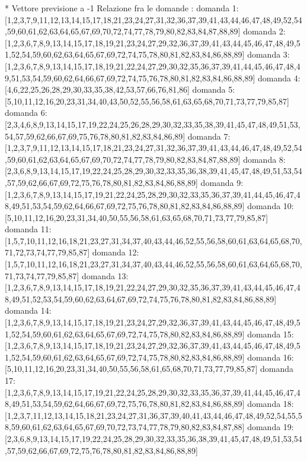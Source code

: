 * Vettore  previsione a -1
Relazione fra le domande :
domanda 1:[1,2,3,7,9,11,12,13,14,15,17,18,21,23,24,27,31,32,36,37,39,41,43,44,46,47,48,49,52,54,59,60,61,62,63,64,65,67,69,70,72,74,77,78,79,80,82,83,84,87,88,89]
domanda 2:[1,2,3,6,7,8,9,13,14,15,17,18,19,21,23,24,27,29,32,36,37,39,41,43,44,45,46,47,48,49,51,52,54,59,60,62,63,64,65,67,69,72,74,75,78,80,81,82,83,84,86,88,89]
domanda 3:[1,2,3,6,7,8,9,13,14,15,17,18,19,21,22,24,27,29,30,32,35,36,37,39,41,44,45,46,47,48,49,51,53,54,59,60,62,64,66,67,69,72,74,75,76,78,80,81,82,83,84,86,88,89]
domanda 4:[4,6,22,25,26,28,29,30,33,35,38,42,53,57,66,76,81,86]
domanda 5:[5,10,11,12,16,20,23,31,34,40,43,50,52,55,56,58,61,63,65,68,70,71,73,77,79,85,87]
domanda 6:[2,3,4,6,8,9,13,14,15,17,19,22,24,25,26,28,29,30,32,33,35,38,39,41,45,47,48,49,51,53,54,57,59,62,66,67,69,75,76,78,80,81,82,83,84,86,89]
domanda 7:[1,2,3,7,9,11,12,13,14,15,17,18,21,23,24,27,31,32,36,37,39,41,43,44,46,47,48,49,52,54,59,60,61,62,63,64,65,67,69,70,72,74,77,78,79,80,82,83,84,87,88,89]
domanda 8:[2,3,6,8,9,13,14,15,17,19,22,24,25,28,29,30,32,33,35,36,38,39,41,45,47,48,49,51,53,54,57,59,62,66,67,69,72,75,76,78,80,81,82,83,84,86,88,89]
domanda 9:[1,2,3,6,7,8,9,13,14,15,17,19,21,22,24,25,28,29,30,32,33,35,36,37,39,41,44,45,46,47,48,49,51,53,54,59,62,64,66,67,69,72,75,76,78,80,81,82,83,84,86,88,89]
domanda 10:[5,10,11,12,16,20,23,31,34,40,50,55,56,58,61,63,65,68,70,71,73,77,79,85,87]
domanda 11:[1,5,7,10,11,12,16,18,21,23,27,31,34,37,40,43,44,46,52,55,56,58,60,61,63,64,65,68,70,71,72,73,74,77,79,85,87]
domanda 12:[1,5,7,10,11,12,16,18,21,23,27,31,34,37,40,43,44,46,52,55,56,58,60,61,63,64,65,68,70,71,73,74,77,79,85,87]
domanda 13:[1,2,3,6,7,8,9,13,14,15,17,18,19,21,22,24,27,29,30,32,35,36,37,39,41,43,44,45,46,47,48,49,51,52,53,54,59,60,62,63,64,67,69,72,74,75,76,78,80,81,82,83,84,86,88,89]
domanda 14:[1,2,3,6,7,8,9,13,14,15,17,18,19,21,23,24,27,29,32,36,37,39,41,43,44,45,46,47,48,49,51,52,54,59,60,61,62,63,64,65,67,69,72,74,75,78,80,82,83,84,86,88,89]
domanda 15:[1,2,3,6,7,8,9,13,14,15,17,18,19,21,23,24,27,29,32,36,37,39,41,43,44,45,46,47,48,49,51,52,54,59,60,61,62,63,64,65,67,69,72,74,75,78,80,82,83,84,86,88,89]
domanda 16:[5,10,11,12,16,20,23,31,34,40,50,55,56,58,61,65,68,70,71,73,77,79,85,87]
domanda 17:[1,2,3,6,7,8,9,13,14,15,17,19,21,22,24,25,28,29,30,32,33,35,36,37,39,41,44,45,46,47,48,49,51,53,54,59,62,64,66,67,69,72,75,76,78,80,81,82,83,84,86,88,89]
domanda 18:[1,2,3,7,11,12,13,14,15,18,21,23,24,27,31,36,37,39,40,41,43,44,46,47,48,49,52,54,55,58,59,60,61,62,63,64,65,67,69,70,72,73,74,77,78,79,80,82,83,84,87,88]
domanda 19:[2,3,6,8,9,13,14,15,17,19,22,24,25,28,29,30,32,33,35,36,38,39,41,45,47,48,49,51,53,54,57,59,62,66,67,69,72,75,76,78,80,81,82,83,84,86,88,89]
